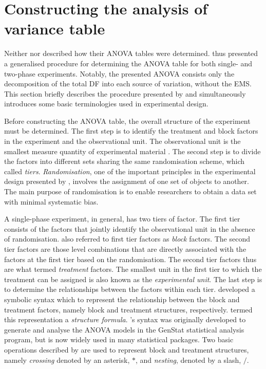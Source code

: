 \documentclass[11pt,a4paper]{article}
\begin{document}
\section{Constructing the analysis of variance table}
\label{sec:Brien1983}
Neither \cite{McIntyre1955} nor \cite{Curnow1959} described how their ANOVA tables were determined. \cite{Brien1983} thus presented a generalised procedure for determining the ANOVA table for both single- and two-phase experiments. Notably, the presented ANOVA consists only the decomposition of the total DF into each source of variation, without the EMS. This section briefly describes the procedure presented by \cite{Brien1983} and simultaneously introduces some basic terminologies used in experimental design.

Before constructing the ANOVA table, the overall structure of the experiment must be determined. The first step is to identify the treatment and block factors in the experiment and the observational unit. The observational unit is the smallest measure quantity of experimental material \cite{Bailey2008}. The second step is to divide the factors into different sets sharing the same randomisation scheme, which \cite{Brien1983} called \emph{tiers}. \emph{Randomisation}, one of the important principles in the experimental design presented by \cite{Fisher1935}, involves the assignment of one set of objects to another. The main purpose of randomisation is to enable researchers to obtain a data set with minimal systematic bias. 

A single-phase experiment, in general, has two tiers of factor. The first tier consists of the factors that jointly identify the observational unit in the absence of randomisation. \cite{Nelder1965A} also referred to first tier factors as \emph{block} factors. The second tier factors are those level combinations that are directly associated with the factors at the first tier based on the randomisation. The second tier factors thus are what \cite{Nelder1965B} termed \emph{treatment} factors. The smallest unit in the first tier to which the treatment can be assigned is also known as the \emph{experimental unit}. The last step is to determine the relationships between the factors within each tier. \cite{Wilkinson1973} developed a symbolic syntax which to represent the relationship between the block and treatment factors, namely block and treatment structures, respectively. \cite{Brien1999} termed this representation a \emph{structure formula}. \citeauthor{Wilkinson1973}'s syntax was originally developed to generate and analyse the ANOVA models in the GenStat statistical analysis program, but is now widely used in many statistical packages. Two basic operations described by \cite{Wilkinson1973} are used to represent block and treatment structures, namely \emph{crossing} denoted by an asterisk, $*$, and \emph{nesting}, denoted by a slash, $/$. 
\end{document}
